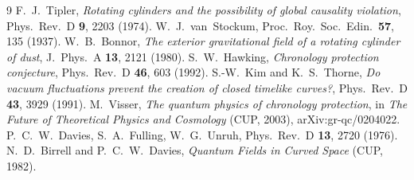 \documentclass[11pt]{article}
\begin{document}
\begin{thebibliography}{9}
 F.~J.~Tipler, \emph{Rotating cylinders and the possibility of global causality violation}, Phys.\ Rev.\ D \textbf{9}, 2203 (1974).
 W.~J.~van~Stockum, Proc.\ Roy.\ Soc.\ Edin.\ \textbf{57}, 135 (1937).
 W.~B.~Bonnor, \emph{The exterior gravitational field of a rotating cylinder of dust}, J.\ Phys.\ A \textbf{13}, 2121 (1980).
 S.~W.~Hawking, \emph{Chronology protection conjecture}, Phys.\ Rev.\ D \textbf{46}, 603 (1992).
 S.-W.~Kim and K.~S.~Thorne, \emph{Do vacuum fluctuations prevent the creation of closed timelike curves?}, Phys.\ Rev.\ D \textbf{43}, 3929 (1991).
 M.~Visser, \emph{The quantum physics of chronology protection}, in \emph{The Future of Theoretical Physics and Cosmology} (CUP, 2003), arXiv:gr-qc/0204022.
 P.~C.~W.~Davies, S.~A.~Fulling, W.~G.~Unruh, Phys.\ Rev.\ D \textbf{13}, 2720 (1976).
 N.~D.~Birrell and P.~C.~W.~Davies, \emph{Quantum Fields in Curved Space} (CUP, 1982).
\end{thebibliography}
\end{document}
